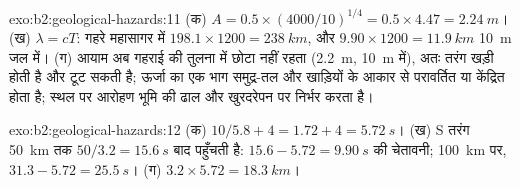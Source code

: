 \begin{solution}{exo:b2:geological-hazards:11}
(क) $A = 0.5 \times (4000/10)^{1/4} = 0.5 \times 4.47 = \qty{2.24}{m}$। (ख) $\lambda = cT$:
गहरे महासागर में $198.1 \times 1200 = \qty{238}{km}$, और $9.90 \times 1200 = \qty{11.9}{km}$
\qty{10}{m} जल में। (ग) आयाम अब गहराई की तुलना में छोटा नहीं रहता (\qty{2.2}{m},
\qty{10}{m} में), अतः तरंग खड़ी होती है और टूट सकती है; ऊर्जा का एक भाग समुद्र-तल और खाड़ियों के आकार से
परावर्तित या केंद्रित होता है; स्थल पर आरोहण भूमि की ढाल और खुरदरेपन पर
निर्भर करता है।
\end{solution}

\begin{solution}{exo:b2:geological-hazards:12}
(क) $10/5.8 + 4 = 1.72 + 4 = \qty{5.72}{s}$। (ख) S तरंग \qty{50}{km} तक $50/3.2 =
\qty{15.6}{s}$ बाद पहुँचती है: $15.6 - 5.72 = \qty{9.90}{s}$ की चेतावनी; \qty{100}{km} पर, $31.3 - 5.72 =
\qty{25.5}{s}$। (ग) $3.2 \times 5.72 = \qty{18.3}{km}$।
\end{solution}

